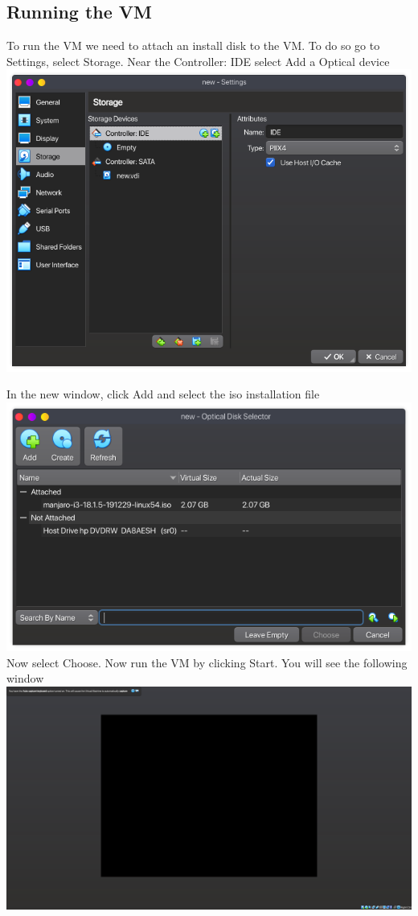 \documentclass{article}
\begin{document}
\newpage

\subsection{Running the VM}
To run the VM we need to attach an install disk to the VM. To do so go to Settings, 
select Storage. Near the Controller: IDE select Add a Optical device
\newline
\includegraphics[width=1.2\textwidth]{img/p26/ss4.png}

In the new window, click Add and select the iso installation file
\newline
\includegraphics[width=1.2\textwidth]{img/p26/ss5.png}
Now select Choose.
Now run the VM by clicking Start. You will see the following window
\newline
\includegraphics[width=1.2\textwidth]{img/p26/ss6.png}
\end{document}
